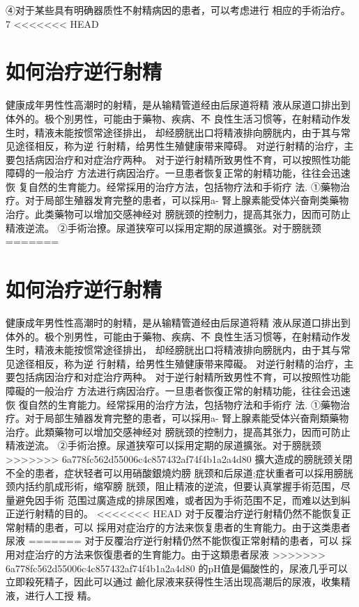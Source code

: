 \documentclass[12pt,UTF8]{ctexbook}
\begin{document}
④对于某些具有明确器质性不射精病因的患者，可以考虑进行
相应的手術治疗。
7
<<<<<<< HEAD
\section{如何治疗逆行射精}
健康成年男性性高潮时的射精，是从输精管道经由后尿道将精
液从尿道口排出到体外的。极个別男性，可能由于藥物、疾病、不
良性生活习惯等，在射精动作发生时，精液未能按惯常途径排出，
却经膀胱出口将精液排向膀胱内，由于其与常见途径相反，称为逆
行射精，给男性生殖健康带来障碍。
对逆行射精的治疗，主要包括病因治疗和对症治疗两种。
对于逆行射精所致男性不育，可以按照性功能障碍的一般治疗
方法进行病因治疗。一旦患者恢复正常的射精功能，往往会迅速恢
复自然的生育能力。经常採用的治疗方法，包括物疗法和手術疗
法.
①藥物治疗。对于局部生殖器发育完整的患者，可以採用a-
腎上腺素能受体兴奋劑类藥物治疗。此类藥物可以增加交感神经对
膀胱颈的控制力，提高其张力，因而可防止精液逆流。
②手術治撩。尿道狭窄可以採用定期的尿道擴张。对于膀胱颈
=======
\section{如何治疗逆行射精}
健康成年男性性高潮时的射精，是从输精管道经由后尿道将精
液从尿道口排出到体外的。极个別男性，可能由于藥物、疾病、不
良性生活习惯等，在射精动作发生时，精液未能按惯常途径排出，
却经膀胱出口将精液排向膀胱内，由于其与常见途径相反，称为逆
行射精，给男性生殖健康带来障礙。
对逆行射精的治疗，主要包括病因治疗和对症治疗两种。
对于逆行射精所致男性不育，可以按照性功能障礙的一般治疗
方法进行病因治疗。一旦患者恢復正常的射精功能，往往会迅速恢
復自然的生育能力。经常採用的治疗方法，包括物疗法和手術疗
法.
①藥物治疗。对于局部生殖器发育完整的患者，可以採用a-
腎上腺素能受体兴奋劑類藥物治疗。此類藥物可以增加交感神经对
膀胱颈的控制力，提高其张力，因而可防止精液逆流。
②手術治撩。尿道狭窄可以採用定期的尿道擴张。对于膀胱颈
>>>>>>> 6a778fc562d55006c4c857432af74f4b1a2a4d80
擴大造成的膀胱颈关閉不全的患者，症状轻者可以用硝酸銀燒灼膀
胱颈和后尿道;症状重者可以採用膀胱颈内括约肌成形術，缩窄膀
胱颈，阻止精液的逆流，但要认真掌握手術范围，尽量避免因手術
范围过廣造成的排尿困难，或者因为手術范围不足，而难以达到糾
正逆行射精的目的。
<<<<<<< HEAD
对于反覆治疗逆行射精仍然不能恢复正常射精的患者，可以
採用对症治疗的方法来恢复患者的生育能力。由于这类患者尿液
=======
对于反覆治疗逆行射精仍然不能恢復正常射精的患者，可以
採用对症治疗的方法来恢復患者的生育能力。由于这類患者尿液
>>>>>>> 6a778fc562d55006c4c857432af74f4b1a2a4d80
的pH值是偏酸性的，尿液几乎可以立即殺死精子，因此可以通过
鹼化尿液来获得性生活出现高潮后的尿液，收集精液，进行人工授
精。
\end{document}
